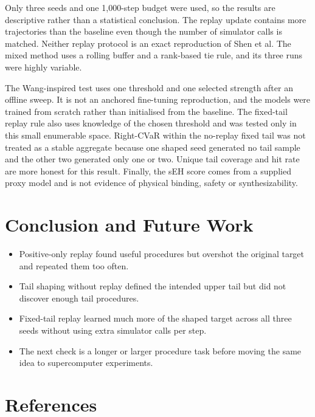 \documentclass{article}
\begin{document}
Only three seeds and one 1,000-step budget were used, so the results are descriptive rather than a statistical conclusion. The replay update contains more trajectories than the baseline even though the number of simulator calls is matched. Neither replay protocol is an exact reproduction of Shen et al. The mixed method uses a rolling buffer and a rank-based tie rule, and its three runs were highly variable.

The Wang-inspired test uses one threshold and one selected strength after an offline sweep. It is not an anchored fine-tuning reproduction, and the models were trained from scratch rather than initialised from the baseline. The fixed-tail replay rule also uses knowledge of the chosen threshold and was tested only in this small enumerable space. Right-CVaR within the no-replay fixed tail was not treated as a stable aggregate because one shaped seed generated no tail sample and the other two generated only one or two. Unique tail coverage and hit rate are more honest for this result. Finally, the sEH score comes from a supplied proxy model and is not evidence of physical binding, safety or synthesizability.

\section{Conclusion and Future Work}

\begin{itemize}
    \item Positive-only replay found useful procedures but overshot the original target and repeated them too often.
    \item Tail shaping without replay defined the intended upper tail but did not discover enough tail procedures.
    \item Fixed-tail replay learned much more of the shaped target across all three seeds without using extra simulator calls per step.
    \item The next check is a longer or larger procedure task before moving the same idea to supercomputer experiments.
\end{itemize}

\section{References}
\end{document}
